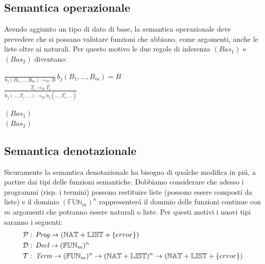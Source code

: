 		\subsection{Semantica operazionale}
		
		\qquad Avendo aggiunto un tipo di dato di base, la semantica operazionale deve prevedere che si possano valutare funzioni che abbiano, come argomenti, anche le liste oltre ai naturali. Per questo motivo le due regole di inferenza $(Bas_1)$ e $(Bas_2)$ diventano:\\
		\begin{minipage}{0.7\linewidth}
			\vspace{5 mm}
			\begin{flushleft}
				$\frac{}{\text{b}_j(B_1,\dots,B_m)\rightarrow_D \, B} \, b_j(B_1,\dots,B_m) = B$\\
				$\frac{T_i \rightarrow_D T^{'}_i}{\text{b}_j(\dots,T_i,\dots)\rightarrow_D\text{b}_j(\dots,T^{'}_i,\dots)}$\\
			\end{flushleft}
		\end{minipage}
		\hfill
		\begin{minipage}{0.2\linewidth}
			\vspace{5 mm}
			\begin{flushright}
				$(Bas_1)$\\
				$(Bas_2)$\\
			\end{flushright}
		\end{minipage}
		
		\subsection{Semantica denotazionale}
		
		\qquad Sicuramente la semantica denotazionale ha bisogno di qualche modifica in pi\'u, a partire dai tipi delle funzioni semantiche. Dobbiamo considerare che adesso i programmi (risp. i termini) possono restituire liste (possono essere composti da liste) e il dominio $(\mathbb{FUN}_m)^n$ rappresenter\'a il dominio delle funzioni continue con $m$ argomenti che potranno essere naturali o liste. Per questi motivi i nuovi tipi saranno i seguenti:
		\begin{align*}
		\mathcal{P} & : \, \emph{Prog}\rightarrow (\mathbb{NAT}+\mathbb{LIST}+\{error\})\\
		\mathcal{D} & : \, \emph{Decl}\rightarrow (\mathbb{FUN}_m)^n\\
		\mathcal{T} & : \, \emph{Term}\rightarrow (\mathbb{FUN}_m)^n \rightarrow (\mathbb{NAT}+\mathbb{LIST})^n \rightarrow (\mathbb{NAT}+\mathbb{LIST}+\{error\})\\
		\end{align*}
		
